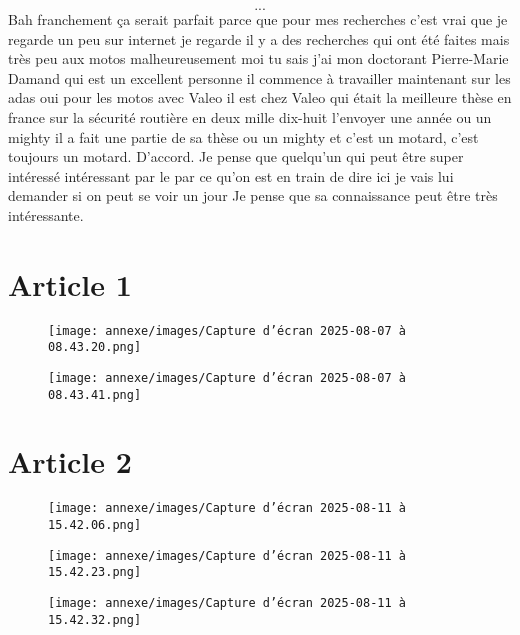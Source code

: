 \[...\]
\ifconfidentiel
Bah franchement ça serait parfait parce que pour mes recherches c'est vrai que je regarde un peu sur internet je regarde il y a des recherches qui ont été faites mais très peu aux motos malheureusement moi tu sais j'ai mon doctorant Pierre-Marie Damand qui est un excellent personne il commence à travailler maintenant sur les adas oui pour les motos avec Valeo il est chez Valeo qui était la meilleure thèse en france sur la sécurité routière en deux mille dix-huit l'envoyer une année ou un mighty il a fait une partie de sa thèse ou un mighty et c'est un motard, c'est toujours un motard. D'accord. Je pense que quelqu'un qui peut être super intéressé intéressant par le par ce qu'on est en train de dire ici je vais lui demander si on peut se voir un jour Je pense que sa connaissance peut être très intéressante.
\fi

\section{Article 1}
\begin{figure}[H]
    \centering
    \texttt{[image: annexe/images/Capture d’écran 2025-08-07 à 08.43.20.png]} 
    \label{articlemoto}
\end{figure}
\begin{figure}[H]
    \centering
    \texttt{[image: annexe/images/Capture d’écran 2025-08-07 à 08.43.41.png]} 
\end{figure}


\section{Article 2}
\begin{figure}[H]
    \centering
    \texttt{[image: annexe/images/Capture d’écran 2025-08-11 à 15.42.06.png]} 
    \label{articlevoiture}
\end{figure}
\begin{figure}[H]
    \centering
    \texttt{[image: annexe/images/Capture d’écran 2025-08-11 à 15.42.23.png]} 
\end{figure}
\begin{figure}[H]
    \centering
    \texttt{[image: annexe/images/Capture d’écran 2025-08-11 à 15.42.32.png]} 
\end{figure}

